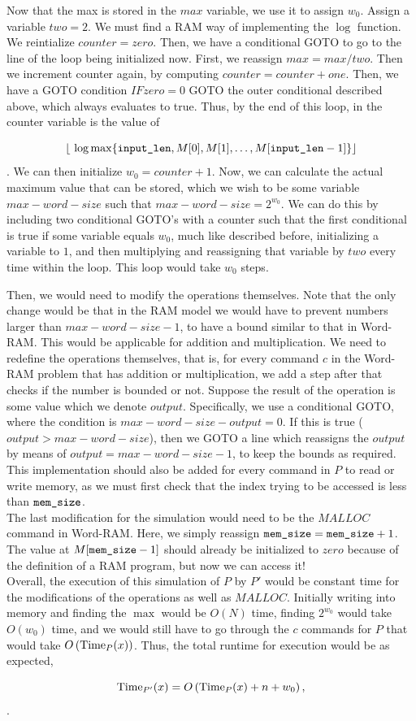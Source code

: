 \documentclass[11pt]{article}
\begin{document}
\begin{enumerate}
Now that the max is stored in the $max$ variable, we use it to assign $w_0$. Assign a variable $two = 2$. We must find a RAM way of implementing the $\log$ function. We reintialize $counter = zero$. Then, we have a conditional GOTO to go to the line of the loop being initialized now. First, we reassign $max = max / two$. Then we increment counter again, by computing $counter = counter + one$. Then, we have a GOTO condition $IF zero = 0$ GOTO the outer conditional described above, which always evaluates to true. Thus, by the end of this loop, in the counter variable is the value of  

$$\lfloor \ \log \max\{\texttt{input\_len}, M[0], M[1], \dots, M[\texttt{input\_len}-1]\}\rfloor$$. We can then initialize $w_0 = counter + 1$. Now, we can calculate the actual maximum value that can be stored, which we wish to be some variable $max-word-size$ such that $max-word-size = 2^{w_0}$. We can do this by including two conditional GOTO's with a counter such that the first conditional is true if some variable equals $w_0$, much like described before, initializing a variable to $1$, and then multiplying and reassigning that variable by $two$ every time within the loop. This loop would take $w_0$ steps. 

Then, we would need to modify the operations themselves. Note that the only change would be that in the RAM model we would have to prevent numbers larger than $max-word-size - 1$, to have a bound similar to that in Word-RAM. This would be applicable for addition and multiplication. We need to redefine the operations themselves, that is, for every command $c$ in the Word-RAM problem that has addition or multiplication, we add a step after that checks if the number is bounded or not. Suppose the result of the operation is some value which we denote $output$. Specifically, we use a conditional GOTO, where the condition is $max-word-size - output = 0$. If this is true ($output > max-word-size$), then we GOTO a line which reassigns the $output$ by means of $output = max-word-size - 1$, to keep the bounds as required. This implementation should also be added for every command in $P$ to read or write memory, as we must first check that the index trying to be accessed is less than $\texttt{mem\_size}$. \\

The last modification for the simulation would need to be the $MALLOC$ command in Word-RAM. Here, we simply reassign $\texttt{mem\_size} = \texttt{mem\_size} + 1$. The value at $M[\texttt{mem\_size} - 1]$ should already be initialized to $zero$ because of the definition of a RAM program, but now we can access it! \\

Overall, the execution of this simulation of $P$ by $P'$ would be constant time for the modifications of the operations as well as $MALLOC$. Initially writing into memory and finding the $\max$ would be $O(N)$ time, finding $2^{w_0}$ would take $O(w_0)$ time, and we would still have to go through the $c$ commands for $P$ that would take $O\left(\mathrm{Time}_P(x)\right)$. Thus, the total runtime for execution would be as expected, 

$$\mathrm{Time}_{P'}(x) = O\left(\mathrm{Time}_P(x)+n+w_0\right),$$. 
\end{enumerate}
\end{document}

